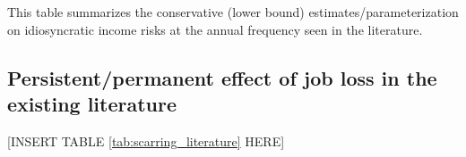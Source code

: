 \begin{sidewaystable}[p]
\begin{adjustbox}{width={\textwidth}}
\begin{threeparttable}
\begin{tabular}{llllllll}
\hline
\hline 
\end{tabular} 
	\begin{flushleft}
\item This table summarizes the  conservative (lower bound) estimates/parameterization on idiosyncratic income risks at the annual frequency seen in the literature.    \end{flushleft}
\end{threeparttable}
\end{adjustbox}
	\end{sidewaystable}
	
	
	

\subsection{Persistent/permanent effect of job loss in the existing literature}

\begin{center}
[INSERT TABLE \ref{tab:scarring_literature} HERE]  
\end{center}


